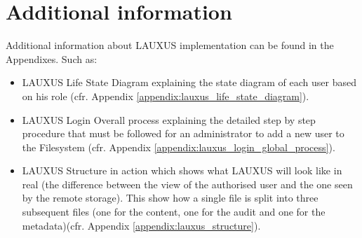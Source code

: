 \documentclass[../main.tex]{subfiles}
\begin{document}
\section{Additional information}
\par Additional information about LAUXUS implementation can be found in the Appendixes. Such as:
\begin{itemize}
    \item LAUXUS Life State Diagram explaining the state diagram of each user based on his role (cfr. Appendix \ref{appendix:lauxus_life_state_diagram}).
    \item LAUXUS Login Overall process explaining the detailed step by step procedure that must be followed for an administrator to add a new user to the Filesystem (cfr. Appendix \ref{appendix:lauxus_login_global_process}).
    \item LAUXUS Structure in action which shows what LAUXUS will look like in real (the difference between the view of the authorised user and the one seen by the remote storage). This show how a single file is split into three subsequent files (one for the content, one for the audit and one for the metadata)(cfr. Appendix \ref{appendix:lauxus_structure}).
\end{itemize}
\end{document}
